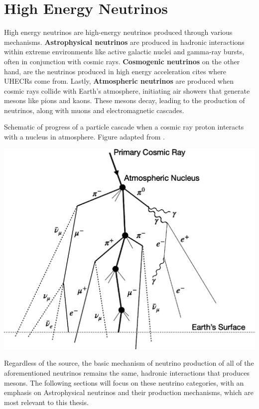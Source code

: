 \section{High Energy Neutrinos}
\label{sec:cosmic_nu}
High energy neutrinos are high-energy neutrinos produced through various mechanisms. \textbf{Astrophysical neutrinos} are produced in hadronic interactions within extreme environments like active galactic nuclei and gamma-ray bursts, often in conjunction with cosmic rays. \textbf{Cosmogenic neutrinos} on the other hand, are the neutrinos produced in high energy acceleration cites where UHECRs come from. Lastly, \textbf{Atmospheric neutrinos} are produced when cosmic rays collide with Earth's atmosphere, initiating air showers that generate mesons like pions and kaons. These mesons decay, leading to the production of neutrinos, along with muons and electromagnetic cascades. 

\begin{marginfigure}
    \caption[Schematic of extensive air shower]{Schematic of progress of a particle cascade when a cosmic ray proton interacts with a nucleus in atmosphere. Figure adapted from \cite{CR_shower_fig}.}
    \includegraphics{./figures/nu_he/CRshower.png}
\end{marginfigure}
Regardless of the source, the basic mechanism of neutrino production of all of the aforementioned neutrinos remains the same, hadronic interactions that produces mesons. The following sections will focus on these neutrino categories, with an emphasis on Astrophysical neutrinos and their production mechanisms, which are most relevant to this thesis.

